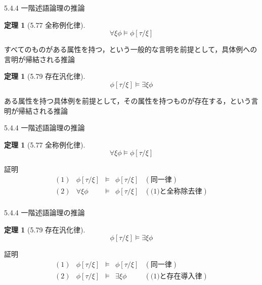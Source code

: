 \documentclass[dvipdfmx,11pt]{beamer}
\newtheorem{theo}[theorem]{定理}
\begin{document}
\begin{frame}{5.4.4 一階述語論理の推論}
  \begin{theo}[5.77 全称例化律]
    \[
    \forall \xi \phi \vDash \phi [ \tau / \xi ]
    \]
  \end{theo}
  すべてのものがある属性を持つ，という一般的な言明を前提として，具体例への言明が帰結される推論
  \begin{theo}[5.79 存在汎化律]
    \[
    \phi[\tau/\xi]\vDash\exists \xi \phi
    \]
  \end{theo}
  ある属性を持つ具体例を前提として，その属性を持つものが存在する，という言明が帰結される推論
\end{frame}

\begin{frame}{5.4.4 一階述語論理の推論}
  \begin{theo}[5.77 全称例化律]
    \[
    \forall \xi \phi \vDash \phi [ \tau / \xi ]
    \]
  \end{theo}

  \begin{block}{証明}
    \[
    \begin{array}{rrcll}
      (1) & \phi[\tau/\xi] & \vDash & \phi[\tau/\xi] & (\textit{同一律}) \\
      (2) & \forall \xi \phi & \vDash & \phi[\tau/\xi] & (\textit{(1)と全称除去律}) \\
    \end{array}
    \]
  \end{block}
\end{frame}

\begin{frame}{5.4.4 一階述語論理の推論}
  \begin{theo}[5.79 存在汎化律]
    \[
    \phi[\tau/\xi]\vDash\exists \xi \phi
    \]
  \end{theo}

  \begin{block}{証明}
    \[
    \begin{array}{rrcll}
      (1) & \phi [ \tau / \xi ] & \vDash & \phi [ \tau / \xi ] & (\textit{同一律}) \\
      (2) & \phi [ \tau / \xi ] & \vDash & \exists \xi \phi & (\textit{(1)と存在導入律}) \\
    \end{array}
    \]
  \end{block}
\end{frame}
\end{document}
